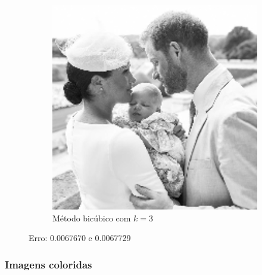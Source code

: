 \documentclass[leqno]{article}
\begin{document}
\begin{figure}[H]
\begin{subfigure}{.33\textwidth}
        \includegraphics[width=.7\linewidth]{../images/principe_bic.png}
        \caption{Método bicúbico com $k = 3$}
        \label{fig:sub1}
      \end{subfigure}%
    \caption{Erro: 0.0067670 e 0.0067729}
    \label{fig:test}
\end{figure}

\subsubsection*{Imagens coloridas}
\end{document}
